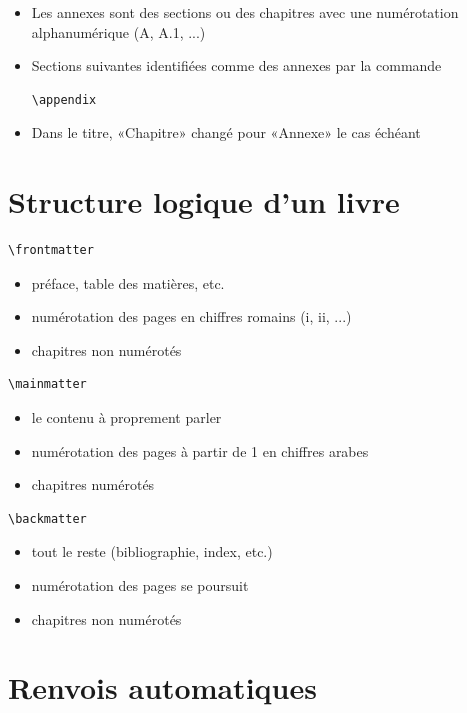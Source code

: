 \begin{itemize}
\item Les annexes sont des sections ou des chapitres avec une
  numérotation alphanumérique (A, A.1, ...)
\item Sections suivantes identifiées comme des annexes par la commande
\begin{lstlisting}
\appendix
\end{lstlisting}
\item Dans le titre, «Chapitre» changé pour «Annexe» le cas échéant
\end{itemize}


\section{Structure logique d'un livre}


\begin{lstlisting}
\frontmatter
\end{lstlisting}
\begin{itemize}
\item préface, table des matières, etc.
\item numérotation des pages en chiffres romains (i, ii, ...)
\item chapitres non numérotés
\end{itemize}

\begin{lstlisting}
\mainmatter
\end{lstlisting}
\begin{itemize}
\item le contenu à proprement parler
\item numérotation des pages à partir de 1 en chiffres arabes
\item chapitres numérotés
\end{itemize}

\begin{lstlisting}
\backmatter
\end{lstlisting}
\begin{itemize}
\item tout le reste (bibliographie, index, etc.)
\item numérotation des pages se poursuit
\item chapitres non numérotés
\end{itemize}


\section{Renvois automatiques}
\label{sec:construction:renvois}



